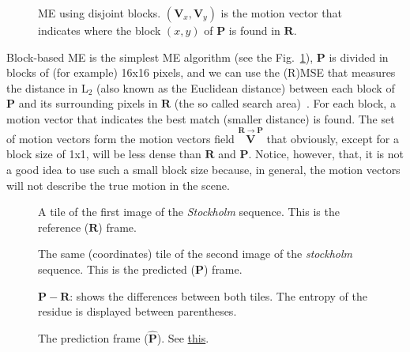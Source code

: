 \begin{figure}
  \centering
  \caption{ME using disjoint blocks. $({\mathbf V}_x, {\mathbf V}_y)$
    is the motion vector that indicates where the block $(x,y)$ of
    ${\mathbf P}$ is found in ${\mathbf R}$.}
  \label{fig:simple}
\end{figure}

Block-based ME is the simplest ME algorithm (see the
Fig.~\ref{fig:simple}), ${\mathbf P}$ is divided in blocks of (for
example) 16x16 pixels, and we can use the (R)MSE that measures the
distance in L$_2$ (also known as the Euclidean distance) between each
block of ${\mathbf P}$ and its surrounding pixels in ${\mathbf R}$
(the so called search area)~\cite{zhu2000new}. For each block, a
motion vector that indicates the best match (smaller distance) is
found. The set of motion vectors form the motion vectors field
$\overset{{\mathbf R}\rightarrow {\mathbf P}}{\mathbf V}$ that
obviously, except for a block size of 1x1, will be less dense than
${\mathbf R}$ and ${\mathbf P}$. Notice, however, that, it is not a
good idea to use such a small block size because, in general, the
motion vectors will not describe the true motion in the scene.

\begin{figure}
  \centering
  \caption{A tile of the first image of the \emph{Stockholm}
    sequence. This is the reference (${\mathbf R}$) frame.}
  \label{fig:R_block}
\end{figure}

\begin{figure}
  \centering
  \caption{The same (coordinates) tile of the second image of the
    \emph{stockholm} sequence. This is the predicted (${\mathbf P}$)
    frame.}
  \label{fig:P_block}
\end{figure}

\begin{figure}
  \centering
  \caption{${\mathbf P} - {\mathbf R}$: shows the differences between
    both tiles. The entropy of the residue is displayed between
    parentheses.}
  \label{fig:RP_block}
\end{figure}

\begin{figure}
  \centering
  \caption{The prediction frame (${\hat{\mathbf P}}$). See \href{https://github.com/Sistemas-Multimedia/Sistemas-Multimedia.github.io/blob/master/milestones/09-ME/full_search_block_ME.ipynb}{this}.}
  \label{fig:hat_P_block}
\end{figure}

